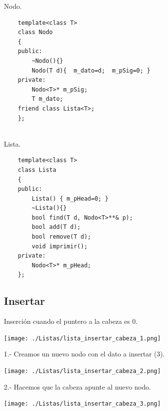 \documentclass{beamer}
\begin{document}
\begin{frame}[fragile]
  Nodo.
  \begin{verbatim}
    template<class T>
    class Nodo
    {
    public:
        ~Nodo(){}
        Nodo(T d){  m_dato=d;  m_pSig=0; }
    private:
        Nodo<T>* m_pSig;
        T m_dato;
    friend class Lista<T>;
    };


  \end{verbatim}
\end{frame}


\begin{frame}[fragile]
  Lista.
  \begin{verbatim}
    template<class T>
    class Lista
    {
    public:
        Lista() { m_pHead=0; }
        ~Lista(){}
        bool find(T d, Nodo<T>**& p);
        bool add(T d);
        bool remove(T d);
        void imprimir();
    private:
        Nodo<T>* m_pHead;    
    };

  \end{verbatim}
\end{frame}

\subsection{Insertar}



\begin{frame}
  
  Inserción cuando el puntero a la cabeza es 0.
        

 \texttt{[image: ./Listas/lista\_insertar\_cabeza\_1.png]}
 


\end{frame}


\begin{frame}
  
  1.- Creamos un nuevo nodo con el dato a insertar (3).
        

 \texttt{[image: ./Listas/lista\_insertar\_cabeza\_2.png]}
 


\end{frame}


\begin{frame}
  
  2.- Hacemos que la cabeza apunte al nuevo nodo.  

 \texttt{[image: ./Listas/lista\_insertar\_cabeza\_3.png]}


\end{frame}
\end{document}
